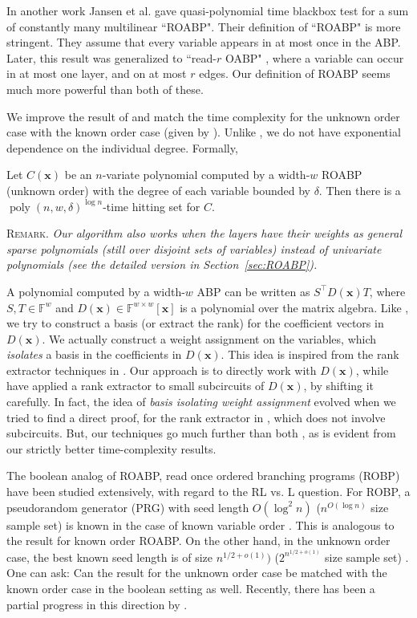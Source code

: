 \documentclass[final,oneeqnum, onethmnum, onefignum]{siamltex1213}
\newcommand{\F}{\mathbb F}
\newcommand{\degree}{\delta} %
\DeclareMathOperator{\poly}{poly}
\newcommand{\x}{\mathbf{x}}
\newenvironment{remark}{R\textsc{emark}.\em}{}
\begin{document}
In another work Jansen et al. \cite{JQS10a} gave quasi-polynomial time blackbox test for a sum of
constantly many multilinear ``ROABP". Their definition of ``ROABP" is more stringent. They assume
that every variable appears in at most once in the ABP. 
Later, this result was generalized to ``read-$r$ OABP" \cite{JQS10b}, where a variable can occur 
in at most one layer, and on at most $r$ edges.
Our definition of ROABP seems much more powerful than both of these.

We improve the result of \cite{FSS13} and match the time complexity for the unknown
order case with the known order case (given by \cite{FS12,FS13}).
Unlike \cite{FSS13}, we do not have exponential dependence on the individual degree.
Formally,

\begin{theorem}
\label{thm:ROABPhs}
Let $C(\mathbf{x})$ be an $n$-variate polynomial computed by a
width-$w$ ROABP (unknown order) with the degree of each variable bounded by $\degree$. 
Then there is a $\poly(n,w,\degree)^{\log n}$-time hitting set for $C$.
\end{theorem}

\begin{remark}
Our algorithm also works when the layers have their weights as general sparse 
polynomials (still over disjoint sets of variables) instead of 
univariate polynomials (see the detailed version in Section~\ref{sec:ROABP}).
\end{remark}

A polynomial computed by a width-$w$ ABP can be written as $S^{\top} D(\x) T$,
 where $S,T \in \F^w$ and $D(\x) \in \F^{w \times w}[\x]$ is a polynomial over 
the matrix algebra.
Like \cite{ASS13,FSS13}, we try to construct a basis (or extract the rank)
 for the coefficient vectors in $D(\x)$.
We actually construct a weight assignment on the variables, which {\em isolates} a
basis in the coefficients in $D(\x)$. 
This idea is inspired from the rank extractor techniques in \cite{ASS13,FSS13}.
Our approach is to directly work with $D(\x)$, while \cite{ASS13,FSS13}
have applied a rank extractor to small subcircuits of $D(\x)$, by shifting it carefully.
In fact, the idea of {\em basis isolating weight assignment} evolved when
we tried to find a direct proof, for the rank extractor in \cite{ASS13}, which
does not involve subcircuits.
But, our techniques go much further than both \cite{ASS13,FSS13}, as is evident
from our strictly better time-complexity results.

The boolean analog of ROABP, read once ordered branching programs (ROBP)
have been studied extensively, with regard to the RL vs. L question.
For ROBP, a pseudorandom generator (PRG) with seed length $O(\log^2 n)$ 
($n^{O(\log n)}$ size sample set)
is known in the case of known variable order \cite{N90}.
This is analogous to the \cite{FS13} result for known order ROABP.
On the other hand, in the unknown order case, the best known seed length
is of size $n^{1/2 + o(1)})$ ($2^{{n}^{1/2+o(1)}}$ size sample set) \cite{IMZ12}.
One can ask: Can the result for the unknown order case be matched with
the known order case in the boolean setting as well.
Recently, there has been a partial progress in this direction by \cite{SVW14}.
\end{document}

